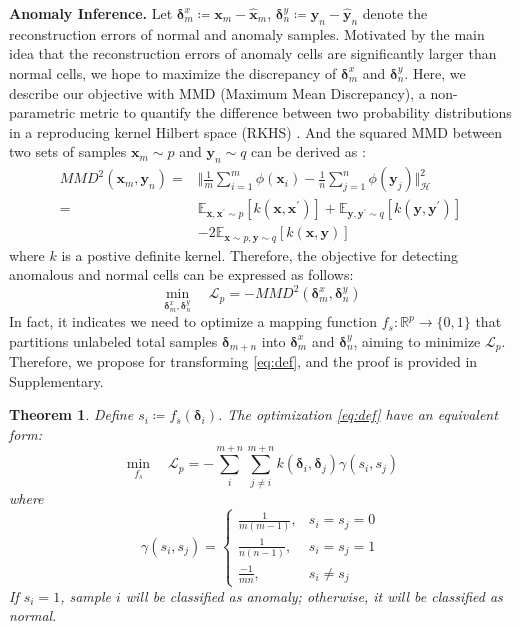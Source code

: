 \documentclass{article}
\newtheorem{theorem}{Theorem}[section]
\begin{document}
\textbf{Anomaly Inference.}
Let $\bm{\delta}_m^x \coloneqq \bm{x}_m - \widehat{\bm{x}}_m$, $\bm{\delta}_n^y \coloneqq \bm{y}_n - \widehat{\bm{y}}_n$
denote the reconstruction errors of normal and anomaly samples.
Motivated by the main idea that the reconstruction errors of anomaly cells are significantly larger than normal cells,
we hope to maximize the discrepancy of $\bm{\delta}_m^x$ and $\bm{\delta}_n^y$.
Here, we describe our objective with MMD (Maximum Mean Discrepancy), a non-parametric metric to quantify the difference between two probability distributions in a reproducing kernel Hilbert space (RKHS) \cite{kolouri2016sliced,gretton2012kernel}.
And the squared MMD between two sets of samples $\bm{x}_m \sim p$ and $\bm{y}_n \sim q$ can be derived as \cite{gretton2012kernel}:
\begin{equation}\label{eq:MMD}
    \begin{aligned}
        MMD^2\left(\bm{x}_m, \bm{y}_n\right) = & \Vert \frac{1}{m}\sum_{i=1}^{m}\phi(\bm{x}_i) -  \frac{1}{n}\sum_{j=1}^{n}\phi(\bm{y}_j)\Vert_{\mathcal{H}}^2 \\
        =  &\mathbb{E}_{\bm{x}, \bm{x}^{\prime} \sim p}\left[k(\bm{x}, \bm{x}^{\prime})\right] +
        \mathbb{E}_{\bm{y}, \bm{y}^{\prime} \sim q}\left[k(\bm{y}, \bm{y}^{\prime})\right] \\
        & - 2\mathbb{E}_{\bm{x} \sim p, \bm{y} \sim q}\left[k(\bm{x}, \bm{y})\right]
    \end{aligned}
\end{equation}
where $k$ is a postive definite kernel.
Therefore, the objective for detecting anomalous and normal cells can be expressed as follows:
\begin{equation}\label{eq:def}
        \min_{\bm{\delta}_m^x, \bm{\delta}_n^y} \quad \mathcal{L}_p =  -MMD^2\left(\bm{\delta}_m^x, \bm{\delta}_n^y\right)
\end{equation}
In fact, it indicates we need to optimize a mapping function $f_s: \mathbb{R}^p \rightarrow \{0, 1\}$ that partitions unlabeled total samples $\bm{\delta}_{m+n}$ into $\bm{\delta}_m^x$ and $\bm{\delta}_n^y$, aiming to minimize $\mathcal{L}_p$.
Therefore, we propose  for transforming \eqref{eq:def}, and the proof is provided in Supplementary.
\begin{theorem}\label{th:opt_s}
Define $s_i \coloneqq f_s(\bm{\delta}_i)$. The optimization \eqref{eq:def} have an equivalent form:
\begin{equation}\label{eq:def_s}
    \min_{f_s} \quad \mathcal{L}_p = -\sum_{i}^{m+n}\sum_{j\neq i}^{m+n} k(\bm{\delta}_i, \bm{\delta}_j) \gamma(s_i, s_j)
\end{equation}
where
\begin{equation}\label{eq:gamma}
    \gamma(s_i, s_j) = 
    \begin{cases}
        \frac{1}{m(m-1)}, & s_i = s_j = 0 \\
        \frac{1}{n(n-1)}, & s_i = s_j = 1 \\
        \frac{-1}{mn}, & s_i \neq s_j
    \end{cases}
\end{equation}
If $s_i = 1$, sample $i$ will be classified as anomaly; otherwise, it will be classified as normal. 
\end{theorem}
\end{document}
